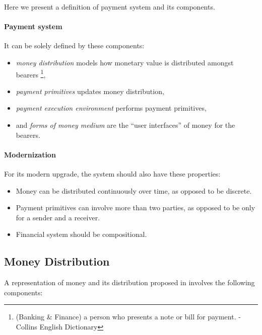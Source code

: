 Here we present a definition of payment system and its components.

\paragraph{Payment system}

It can be solely defined by these components:

\begin{itemize}
    \item \textit{money distribution} models how monetary value is distributed amongst
bearers \footnote{(Banking \& Finance) a person who presents a note or bill for payment. - Collins
English Dictionary},

    \item \textit{payment primitives} updates money distribution,

    \item \textit{payment execution environment} performs payment primitives,

    \item and \textit{forms of money medium} are the ``user interfaces'' of money for the bearers.
\end{itemize}

\paragraph{Modernization}

For its modern upgrade, the system should also have these properties:

\begin{itemize}
    \item Money can be distributed continuously over time, as opposed to be discrete.

    \item Payment primitives can involve more than two parties, as opposed to be only for a sender
and a receiver.

    \item Financial system should be compositional.
\end{itemize}

\subsection{Money Distribution}

A representation of money and its distribution proposed in \cite{buldas2021unifying} involves the
following components:

